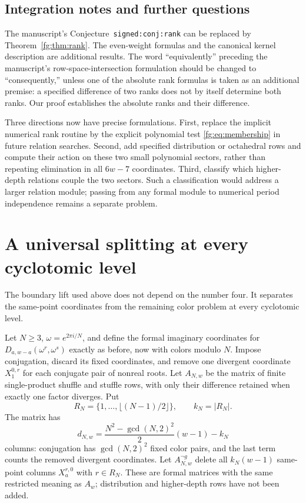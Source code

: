 \documentclass[11pt,a4paper]{article}
\theoremstyle{definition}
\theoremstyle{remark}
\numberwithin{equation}{section}
\begin{document}
\subsection{Integration notes and further questions}

The manuscript's Conjecture~\texttt{signed:conj:rank} can be replaced
by Theorem~\ref{fg:thm:rank}. The even-weight formulas and the
canonical kernel description are additional results. The word
``equivalently'' preceding the manuscript's row-space-intersection
formulation should be changed to ``consequently,'' unless one of
the absolute rank formulas is taken as an additional premise: a
specified difference of two ranks does not by itself determine both
ranks. Our proof establishes the absolute ranks and their difference.

Three directions now have precise formulations. First, replace the
implicit numerical rank routine by the explicit polynomial test
\eqref{fg:eq:membership} in future relation searches. Second, add
specified distribution or octahedral rows and compute their action
on these two small polynomial sectors, rather than repeating
elimination in all $6w-7$ coordinates. Third, classify which
higher-depth relations couple the two sectors. Such a classification
would address a larger relation module; passing from any formal
module to numerical period independence remains a separate problem.
\section{A universal splitting at every cyclotomic level}
\label{fg:sec:universal}

The boundary lift used above does not depend on the number four. It
separates the same-point coordinates from the remaining color problem
at every cyclotomic level.

Let $N\ge3$, $\omega=e^{2\pi i/N}$, and define the formal imaginary
coordinates for $D_{a,w-a}(\omega^r,\omega^s)$ exactly as before, now
with colors modulo $N$. Impose conjugation, discard its fixed
coordinates, and remove one divergent coordinate $X_1^{0,r}$ for
each conjugate pair of nonreal roots. Let $A_{N,w}$ be the matrix of
finite single-product shuffle and stuffle rows, with only their
difference retained when exactly one factor diverges. Put
\[
 R_N=\{1,\ldots,\lfloor(N-1)/2\rfloor\},\qquad k_N=|R_N|.
\]
The matrix has
\[
 d_{N,w}=\frac{N^2-\gcd(N,2)^2}{2}(w-1)-k_N
\]
columns: conjugation has $\gcd(N,2)^2$ fixed color pairs, and the
last term counts the removed divergent coordinates. Let
$A_{N,w}^{\neg g}$ delete all $k_N(w-1)$ same-point columns
$X_a^{r,0}$ with $r\in R_N$. These are formal matrices with the same
restricted meaning as $A_w$; distribution and higher-depth rows
have not been added.
\end{document}
